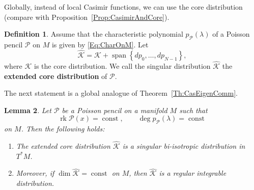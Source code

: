\documentclass[12pt]{article}
\newtheorem{lemma}{Lemma}[section]
\theoremstyle{definition}
\newtheorem{definition}[lemma]{Definition}
\begin{document}
Globally, instead of local Casimir functions, we can use the core distribution (compare with Proposition~\ref{Prop:CasimirAndCore}). 

\begin{definition} Assume that the characteristic polynomial $p_{\mathcal{P}}(\lambda)$ of a Poisson pencil $\mathcal{P}$ on $M$ is given by \eqref{Eq:CharOnM}. Let \begin{equation} \label{Eq:ExtCore} \hat{\mathcal{K}} = \mathcal{K} \plus  \operatorname{span} \left\{ dp_0, \dots, dp_{N-1} \right\}, \end{equation} where $\mathcal{K}$ is the core distribution. We call the singular distribution $\hat{\mathcal{K}}$ the \textbf{extended core distribution} of $\mathcal{P}$. \end{definition}

The next statement is a global analogue of Theorem~\ref{Th:CasEigenComm}.

\begin{lemma} \label{L:ExtCoreLemma} Let $\mathcal{P}$ be a Poisson pencil on a manifold $M$ such that \begin{equation} \label{Eq:CondRkDeg} \operatorname{rk} \mathcal{P}(x) = \operatorname{const}, \qquad \deg p_{\mathcal{P}}(\lambda) = \operatorname{const} \end{equation} on $M$. Then the following holds: 

\begin{enumerate}

\item The extended core distribution $\hat{\mathcal{K}}$ is a singular bi-isotropic distribution in $T^*M$.

\item Moreover, if $\dim \hat{\mathcal{K}} = \operatorname{const}$ on $M$, then $\hat{\mathcal{K}}$ is a regular integrable distribution.

\end{enumerate}

\end{lemma}
\end{document}
